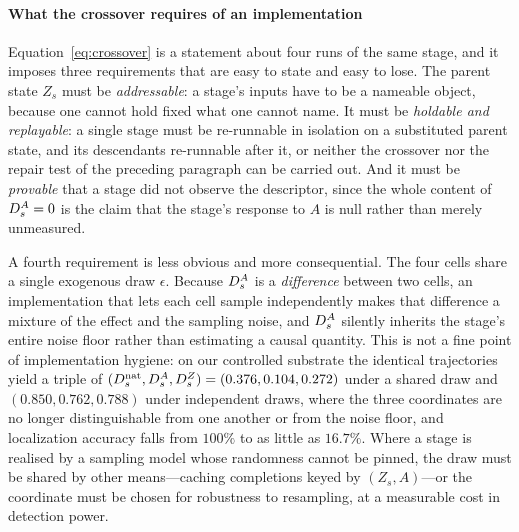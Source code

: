 \paragraph{What the crossover requires of an implementation}
Equation~\eqref{eq:crossover} is a statement about four runs of the same stage, and it imposes
three requirements that are easy to state and easy to lose. The parent state $Z_s$ must be
\emph{addressable}: a stage's inputs have to be a nameable object, because one cannot hold fixed
what one cannot name. It must be \emph{holdable and replayable}: a single stage must be
re-runnable in isolation on a substituted parent state, and its descendants re-runnable after it,
or neither the crossover nor the repair test of the preceding paragraph can be carried out. And it
must be \emph{provable} that a stage did not observe the descriptor, since the whole content of
$D^{A}_s = 0$ is the claim that the stage's response to $A$ is null rather than merely unmeasured.

A fourth requirement is less obvious and more consequential. The four cells share a single
exogenous draw $\epsilon$. Because $D^{A}_s$ is a \emph{difference} between two cells, an
implementation that lets each cell sample independently makes that difference a mixture of the
effect and the sampling noise, and $D^{A}_s$ silently inherits the stage's entire noise floor rather
than estimating a causal quantity. This is not a fine point of implementation hygiene: on our
controlled substrate the identical trajectories yield a  triple of
$(D^{\mathrm{nat}}_s, D^{A}_s, D^{Z}_s) = (0.376, 0.104, 0.272)$ under a shared draw and $(0.850, 0.762, 0.788)$
under independent draws, where the three coordinates are no longer distinguishable from one
another or from the noise floor, and localization accuracy falls from $100\%$ to as little as
$16.7\%$. Where a stage is realised by a sampling model whose randomness cannot be pinned, the
draw must be shared by other means---caching completions keyed by $(Z_s, A)$---or the coordinate
must be chosen for robustness to resampling, at a measurable cost in detection power.

